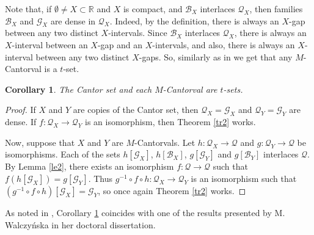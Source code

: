 \documentclass[12pt,a4paper,leqno]{amsart}
\newtheorem{cor}[thm]{Corollary}
\theoremstyle{definition}
\begin{document}
Note that, if $\emptyset\not=X\subset \mathbb R$ and $X$ is  compact, and  $\mathcal B_X$ interlaces $ \mathcal Q_X$, then families $\mathcal B_X$ and $\mathcal G_X$ are dense in  $ \mathcal Q_X$. Indeed, by the definition, there is always an $X$-gap between any two distinct $X$-intervals. Since $\mathcal B_X$ interlaces $ \mathcal Q_X$,  there is always an $X$-interval between an $X$-gap and an $X$-intervals, and also, there is always an $X$-interval between any two distinct $X$-gaps. So, similarly as in \cite[Proposition 10, Lemma 11 and Corollary 12]{bkp} we get that any  $M$-Cantorval is a  $ t $-set. 

\begin{cor}\label{c15}  The Cantor set and each $M$-Cantorval  are  $ t $-sets.   
\end{cor}
\begin{proof} If $X$ and $Y$ are copies of the Cantor set, then $\mathcal Q_X=\mathcal G_X$ and $\mathcal Q_Y=\mathcal G_Y$ are dense. If $f\colon \mathcal Q_X \to \mathcal Q_Y$ is an isomorphism, then Theorem \ref{tr2} works. 

Now, suppose that $X$ and $Y$ are $M$-Cantorvals. Let $h\colon \mathcal Q_X \to \mathcal Q$ and $g\colon \mathcal Q_Y \to \mathcal Q$ be isomorphisms. Each of the sets $h[\mathcal G_X]$, $h[\mathcal B_X]$, $g[\mathcal G_Y]$  and $g[\mathcal B_Y]$  interlaces 
$\mathcal Q$.  By Lemma \ref{le2}, there exists an isomorphism $f\colon \mathcal Q \to \mathcal Q$ such that $f(h[\mathcal G_X]) = g[\mathcal G_Y]$. 
Thus $g^{-1} \circ f \circ h\colon \mathcal Q_X \to \mathcal Q_Y$ is an isomorphism such that $(g^{-1} \circ f \circ h)[\mathcal G_X] = \mathcal G_Y$, so once again Theorem \ref{tr2} works. \end{proof}

As noted in \cite{bkp}, Corollary \ref{c15} coincides with one of the  results presented  by M. Walczy\'nska \cite{wal} in her doctoral dissertation.
\end{document}
